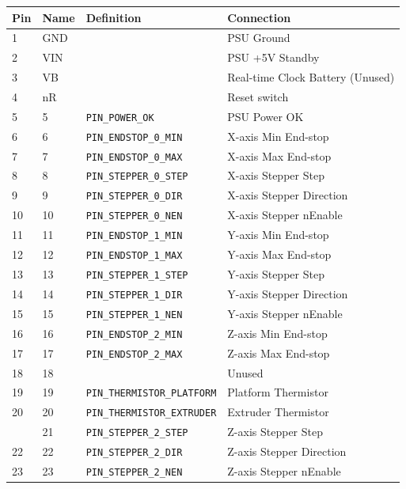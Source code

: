 			\begin{table}
				\centering
				\begin{tabular}{l l l l}
					\toprule
					Pin & Name & Definition & Connection \\
					\midrule
					1  & GND & & PSU Ground \\
					2  & VIN & & PSU +5V Standby \\
					3  & VB  & & Real-time Clock Battery (Unused) \\
					4  & nR  & & Reset switch \\
					5  & 5   & \verb|PIN_POWER_OK| & PSU Power OK \\
					6  & 6   & \verb|PIN_ENDSTOP_0_MIN|  & X-axis Min End-stop \\
					7  & 7   & \verb|PIN_ENDSTOP_0_MAX|  & X-axis Max End-stop \\
					8  & 8   & \verb|PIN_STEPPER_0_STEP| & X-axis Stepper Step \\
					9  & 9   & \verb|PIN_STEPPER_0_DIR|  & X-axis Stepper Direction \\
					10 & 10  & \verb|PIN_STEPPER_0_NEN|  & X-axis Stepper nEnable \\
					11 & 11  & \verb|PIN_ENDSTOP_1_MIN|  & Y-axis Min End-stop \\
					12 & 12  & \verb|PIN_ENDSTOP_1_MAX|  & Y-axis Max End-stop \\
					13 & 13  & \verb|PIN_STEPPER_1_STEP| & Y-axis Stepper Step \\
					14 & 14  & \verb|PIN_STEPPER_1_DIR|  & Y-axis Stepper Direction \\
					15 & 15  & \verb|PIN_STEPPER_1_NEN|  & Y-axis Stepper nEnable \\
					16 & 16  & \verb|PIN_ENDSTOP_2_MIN|  & Z-axis Min End-stop \\
					17 & 17  & \verb|PIN_ENDSTOP_2_MAX|  & Z-axis Max End-stop \\
					18 & 18  & & Unused \\
					19 & 19  & \verb|PIN_THERMISTOR_PLATFORM| & Platform Thermistor \\
					20 & 20  & \verb|PIN_THERMISTOR_EXTRUDER| & Extruder Thermistor \\
					\addlinespace
					21 & 21  & \verb|PIN_STEPPER_2_STEP| & Z-axis Stepper Step \\
					22 & 22  & \verb|PIN_STEPPER_2_DIR|  & Z-axis Stepper Direction \\
					23 & 23  & \verb|PIN_STEPPER_2_NEN|  & Z-axis Stepper nEnable \\

\end{tabular}
\end{table}
